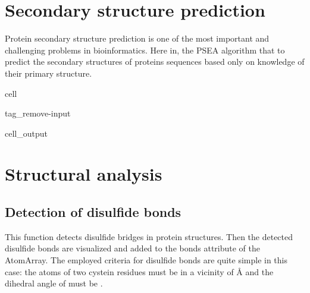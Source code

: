 \documentclass[letterpaper,10pt,english]{jupyterBook}
\begin{document}
\section{Secondary structure prediction}
\label{\detokenize{ipynb/chapter1:secondary-structure-prediction}}
\sphinxAtStartPar
Protein secondary structure prediction is one of the most important and challenging problems in bioinformatics. Here in, the P\sphinxhyphen{}SEA algorithm that to predict the secondary structures of proteins sequences based only on knowledge of their primary structure.

\begin{sphinxuseclass}{cell}
\begin{sphinxuseclass}{tag_remove-input}\begin{sphinxVerbatimOutput}

\begin{sphinxuseclass}{cell_output}
\noindent{}

\end{sphinxuseclass}\end{sphinxVerbatimOutput}

\end{sphinxuseclass}
\end{sphinxuseclass}

\section{Structural analysis}
\label{\detokenize{ipynb/chapter1:structural-analysis}}

\subsection{Detection of disulfide bonds}
\label{\detokenize{ipynb/chapter1:detection-of-disulfide-bonds}}
\sphinxAtStartPar
This function detects disulfide bridges in protein structures. Then the detected disulfide bonds are visualized and added to the bonds attribute of the AtomArray. The employed criteria for disulfide bonds are quite simple in this case: the atoms of two cystein residues must be in a vicinity of Å and the dihedral angle of must be .
\end{document}
